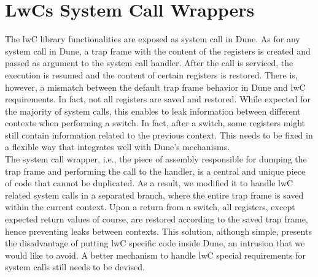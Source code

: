 \section{LwCs System Call Wrappers}
The lwC library functionalities are exposed as system call in Dune.
As for any system call in Dune, a trap frame with the content of the registers is created and passed as argument to the system call handler.
After the call is serviced, the execution is resumed and the content of certain registers is restored.
There is, however, a mismatch between the default trap frame behavior in Dune and lwC requirements.
In fact, not all registers are saved and restored.
While expected for the majority of system calls, this enables to leak information between different contexts when performing a switch.
In fact, after a switch, some registers might still contain information related to the previous context.
This needs to be fixed in a flexible way that integrates well with Dune's mechanisms.\\
The system call wrapper, i.e., the piece of assembly responsible for dumping the trap frame and performing the call to the handler, is a central and unique piece of code that cannot be duplicated.
As a result, we modified it to handle lwC related system calls in a separated branch, where the entire trap frame is saved within the current context.
Upon a return from a switch, all registers, except expected return values of course, are restored according to the saved trap frame, hence preventing leaks between contexts.
This solution, although simple, presents the disadvantage of putting lwC specific code inside Dune, an intrusion that we would like to avoid.
A better mechanism to handle lwC special requirements for system calls still needs to be devised.  

